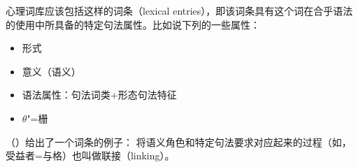 心理词库应该包括这样的词条（lexical entries），即该词条具有这个词在合乎语法的使用中所具备的特定句法属性。比如说下列的一些属性：
\begin{itemize}
\item 形式
\item 意义（语义）
\item 语法属性：句法词类$+$形态句法特征  
\item $\theta$"=栅
\end{itemize}

\noindent
（）给出了一个词条的例子：
\ea
{}
\z
将语义角色和特定句法要求对应起来的过程（如，受益者=与格）也叫做联接（linking）。

